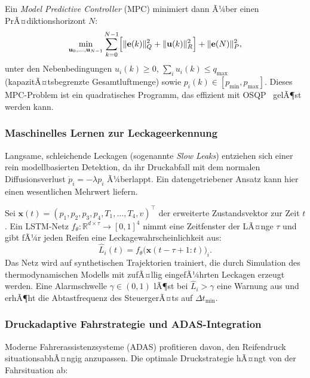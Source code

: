 ﻿\documentclass[a4paper,12pt]{article}
\theoremstyle{definition}
\begin{document}
Ein \emph{Model Predictive Controller} (MPC) minimiert dann Ã¼ber einen
PrÃ¤diktionshorizont $N$:
\[
    \min_{\mathbf{u}_0, \ldots, \mathbf{u}_{N-1}}
    \sum_{k=0}^{N-1}\Bigl[\|\mathbf{e}(k)\|_Q^2
    + \|\mathbf{u}(k)\|_R^2\Bigr]
    + \|\mathbf{e}(N)\|_P^2,
\]
unter den Nebenbedingungen
$u_i(k) \geq 0$, $\sum_i u_i(k) \leq q_{\max}$ (kapazitÃ¤tsbegrenzte
Gesamtluftmenge) sowie $p_i(k) \in [p_{\min}, p_{\max}]$.
Dieses MPC-Problem ist ein quadratisches Programm, das effizient mit
OSQP~\cite{osqp2020} gelÃ¶st werden kann.

\subsubsection{Maschinelles Lernen zur Leckageerkennung}

Langsame, schleichende Leckagen (sogenannte \emph{Slow Leaks}) entziehen sich
einer rein modellbasierten Detektion, da ihr Druckabfall mit dem normalen
Diffusionsverlust $\dot{p}_i = -\lambda p_i$ Ã¼berlappt. Ein datengetriebener
Ansatz kann hier einen wesentlichen Mehrwert liefern.

Sei $\mathbf{x}(t) = (p_1, p_2, p_3, p_4, T_1, \ldots, T_4, v)^{\top}$
der erweiterte Zustandsvektor zur Zeit $t$. Ein LSTM-Netz
$f_\theta: \mathbb{R}^{d \times \tau} \to [0,1]^4$ nimmt eine Zeitfenster
der LÃ¤nge $\tau$ und gibt fÃ¼r jeden Reifen eine Leckagewahr\-scheinlichkeit aus:
\[
    \hat{L}_i(t) = f_\theta\bigl(\mathbf{x}(t-\tau+1:t)\bigr)_i.
\]
Das Netz wird auf synthetischen Trajektorien trainiert, die durch Simulation
des thermodynamischen Modells mit zufÃ¤llig eingefÃ¼hrten Leckagen erzeugt werden.
Eine Alarmschwelle $\gamma \in (0,1)$ lÃ¶st bei $\hat{L}_i > \gamma$ eine
Warnung aus und erhÃ¶ht die Abtastfrequenz des SteuergerÃ¤ts auf $\Delta t_{\min}$.

\subsubsection{Druckadaptive Fahrstrategie und ADAS-Integration}

Moderne Fahrerassistenzsysteme (ADAS) profitieren davon, den Reifendruck
situationsabhÃ¤ngig anzupassen. Die optimale Druckstrategie hÃ¤ngt von der
Fahrsituation ab:
\end{document}
